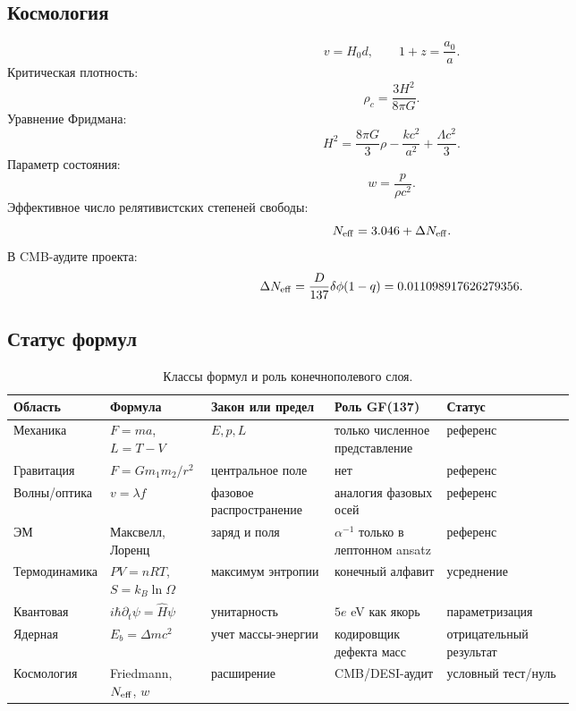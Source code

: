 \documentclass[11pt]{article}
\begin{document}
\subsection{Космология}

\begin{equation}
    v=H_0d,\qquad
    1+z=\frac{a_0}{a}.
\end{equation}
Критическая плотность:
\begin{equation}
    \rho_c=\frac{3H^2}{8\pi G}.
\end{equation}
Уравнение Фридмана:
\begin{equation}
    H^2=\frac{8\pi G}{3}\rho-\frac{kc^2}{a^2}
    +\frac{\Lambda c^2}{3}.
\end{equation}
Параметр состояния:
\begin{equation}
    w=\frac{p}{\rho c^2}.
\end{equation}
Эффективное число релятивистских степеней свободы:
\begin{equation}
    N_{\rm eff}=3.046+\Delta N_{\rm eff}.
\end{equation}
В CMB-аудите проекта:
\begin{equation}
    \Delta N_{\rm eff}
    =
    \frac{D}{137}\delta\phi(1-q)
    =
    0.011098917626279356.
\end{equation}

\subsection{Статус формул}

\begin{table}[h]
\centering
\scriptsize
\caption{Классы формул и роль конечнополевого слоя.}
\setlength{\tabcolsep}{3pt}
\begin{tabularx}{\linewidth}{@{}P{0.13\linewidth}P{0.18\linewidth}P{0.22\linewidth}P{0.20\linewidth}Y@{}}
\toprule
Область & Формула & Закон или предел & Роль GF(137) & Статус \\
\midrule
Механика & $F=ma$, $L=T-V$ & $E,p,L$ & только численное представление & референс \\
Гравитация & $F=Gm_1m_2/r^2$ & центральное поле & нет & референс \\
Волны/оптика & $v=\lambda f$ & фазовое распространение & аналогия фазовых осей & референс \\
ЭМ & Максвелл, Лоренц & заряд и поля & $\alpha^{-1}$ только в лептонном ansatz & референс \\
Термодинамика & $PV=nRT$, $S=k_B\ln\Omega$ & максимум энтропии & конечный алфавит & усреднение \\
Квантовая & $i\hbar\partial_t\psi=\hat{H}\psi$ & унитарность & $5e$ eV как якорь & параметризация \\
Ядерная & $E_b=\Delta mc^2$ & учет массы-энергии & кодировщик дефекта масс & отрицательный результат \\
Космология & Friedmann, $N_{\rm eff}$, $w$ & расширение & CMB/DESI-аудит & условный тест/нуль \\
\bottomrule
\end{tabularx}
\end{table}
\end{document}

